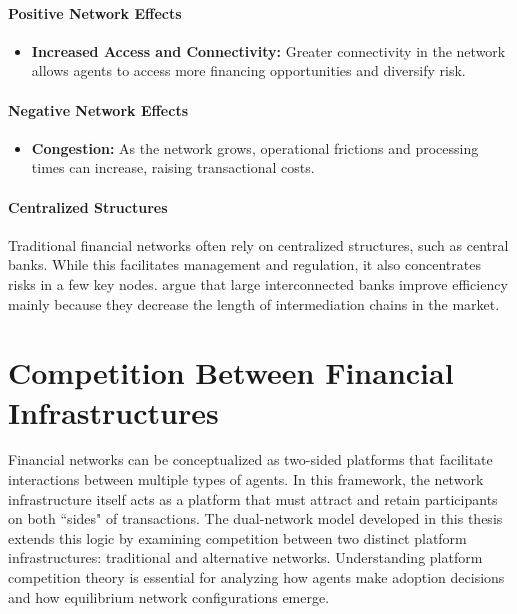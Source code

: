 \paragraph{Positive Network Effects}
\begin{itemize}
\item \textbf{Increased Access and Connectivity:} Greater connectivity in the network allows agents to access more financing opportunities and diversify risk.

\end{itemize}

\paragraph{Negative Network Effects}
\begin{itemize}
    \item \textbf{Congestion:} As the network grows, operational frictions and processing times can increase, raising transactional costs. \cite{hinzen_bitcoins_2022,iyengar_economics_2023} 
\end{itemize}

\paragraph{Centralized Structures}
Traditional financial networks often rely on centralized structures, such as central banks. While this facilitates management and regulation, it also concentrates risks in a few key nodes.  argue that large interconnected banks improve efficiency mainly because
they decrease the length of intermediation chains in the market.  


\section{Competition Between Financial Infrastructures}

Financial networks can be conceptualized as two-sided platforms that facilitate interactions between multiple types of agents. In this framework, the network infrastructure itself acts as a platform that must attract and retain participants on both ``sides" of transactions. The dual-network model developed in this thesis extends this logic by examining competition between two distinct platform infrastructures: traditional and alternative networks. Understanding platform competition theory is essential for analyzing how agents make adoption decisions and how equilibrium network configurations emerge.

